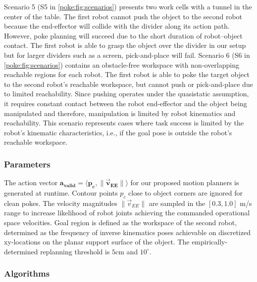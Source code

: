 Scenario 5 (S5 in \cref{poke:fig:scenarios}) presents two work cells with a tunnel in the center of the table. The first robot cannot push the object to the second robot because the end-effector will collide with the divider along its action path. However, poke planning will succeed due to the short duration of robot--object contact. The first robot is able to grasp the object over the divider in our setup but for larger dividers such as a screen, pick-and-place will fail.
Scenario 6 (S6 in \cref{poke:fig:scenarios}) contains an obstacle-free workspace with non-overlapping reachable regions for each robot. The first robot is able to poke the target object to the second robot's reachable workspace, but cannot push or pick-and-place due to limited reachability. Since pushing operates under the quasistatic assumption, it requires constant contact between the robot end-effector and the object being manipulated and therefore, manipulation is limited by robot kinematics and reachability. This scenario represents cases where task success is limited by the robot's kinematic characteristics, i.e., if the goal pose is outside the robot's reachable workspace.

\subsubsection{Parameters}

The action vector $\boldsymbol{a_{valid}} = \langle \boldsymbol{p_c}, \boldsymbol{\|\vec{v}_{EE}\|}\rangle$ for our proposed motion planners is generated at runtime. Contour points $p_c$ close to object corners are ignored for clean pokes. The velocity magnitudes $\|\vec{v}_{EE}\|$ are sampled in the $[0.3, 1.0]$ m/s range to increase likelihood of robot joints achieving the commanded operational space velocities. Goal region is defined as the workspace of the second robot, determined as the frequency of inverse kinematics poses achievable on discretized xy-locations on the planar support surface of the object. The empirically-determined replanning threshold is $5$cm and $10^{\circ}$.

\subsubsection{Algorithms}

